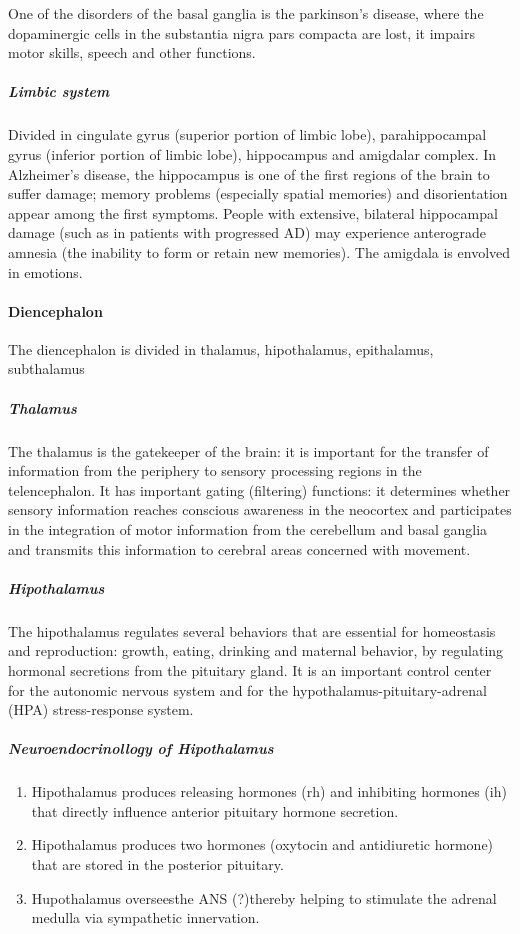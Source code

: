 \documentclass[12pt,article,oneside,a4paper]{memoir}
\begin{document}
One of the disorders of the basal ganglia is the parkinson's disease, where the
dopaminergic cells in the substantia nigra pars compacta are lost, it impairs motor skills, speech and other functions.

\subparagraph{Limbic system}
Divided in cingulate gyrus (superior portion of limbic lobe), parahippocampal gyrus (inferior portion of limbic lobe), hippocampus and amigdalar complex.
In Alzheimer's disease, the hippocampus is one of the first regions of the brain to suffer damage; memory problems (especially spatial memories) and disorientation appear among the first symptoms. People with extensive, bilateral hippocampal damage (such as in patients with progressed AD) may experience anterograde amnesia (the inability to form or retain new memories).
The amigdala is envolved in emotions.

\paragraph{Diencephalon}
The diencephalon is divided in thalamus, hipothalamus, epithalamus, subthalamus

\subparagraph{Thalamus}
The thalamus is the gatekeeper of the brain: it is important for the transfer of information from the periphery to sensory processing regions in the telencephalon. It has important gating (filtering) functions: it determines whether sensory information reaches conscious awareness in the neocortex and participates in the integration of motor information from the cerebellum and basal ganglia and transmits this information to cerebral areas concerned with movement.

\subparagraph{Hipothalamus}
The hipothalamus regulates several behaviors that are essential for homeostasis
and reproduction: growth, eating, drinking and maternal behavior, by regulating hormonal secretions from the pituitary gland. It is an important control center for the autonomic nervous system and for the hypothalamus-pituitary-adrenal (HPA) stress-response system.

\subparagraph{Neuroendocrinollogy of Hipothalamus}
\begin{enumerate}
\item Hipothalamus produces releasing hormones (rh) and inhibiting hormones (ih) that directly influence anterior pituitary hormone secretion.
\item Hipothalamus produces two hormones (oxytocin and antidiuretic hormone) that are stored in the posterior pituitary.
\item Hupothalamus overseesthe ANS (?)thereby helping to stimulate the adrenal medulla via sympathetic innervation.
\end{enumerate}
\end{document}
